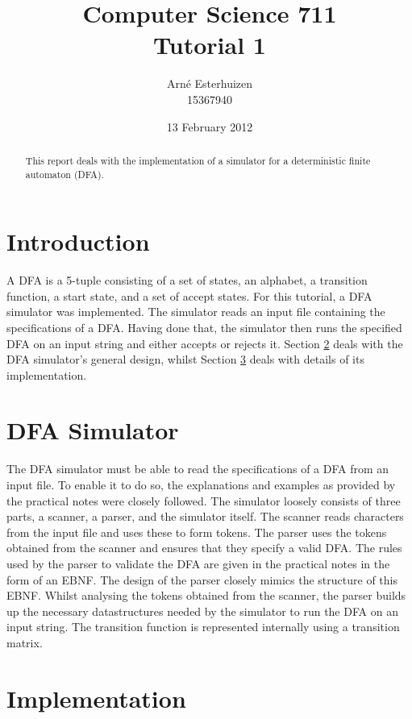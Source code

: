 \documentclass[11pt,a4paper]{article}
\begin{document}
\title{
	Computer Science 711 \\
	Tutorial 1
}
\author{
	Arn\'{e} Esterhuizen \\
	15367940
}
\date{13 February 2012}
\maketitle

\begin{abstract}
\noindent This report deals with the implementation of a simulator for a deterministic finite automaton (DFA).
\end{abstract}

\section{Introduction}
A DFA is a 5-tuple consisting of a set of states, an alphabet, a transition function, a start state, and
a set of accept states. For this tutorial, a DFA simulator was implemented. The simulator reads an input
file containing the specifications of a DFA. Having done that, the simulator then runs the specified
DFA on an input string and either accepts or rejects it. Section \ref{sec:sim} deals with the DFA simulator's
general design, whilst Section \ref{sec:imp} deals with details of its implementation.

\section{DFA Simulator}
\label{sec:sim}

The DFA simulator must be able to read the specifications of a DFA from an input file. To enable it to do so,
the explanations and examples as provided by the practical notes were closely followed. The simulator 
loosely consists of three parts, a scanner, a parser, and the simulator itself.
The scanner reads characters from the input file and uses these to form tokens. The parser uses the tokens
obtained from the scanner and ensures that they specify a valid DFA. The rules used by the parser to validate
the DFA are given in the practical notes in the form of an EBNF. The design of the parser closely mimics the structure
of this EBNF. Whilst analysing the tokens obtained from the scanner, the parser builds up the necessary datastructures
needed by the simulator to run the DFA on an input string. The transition function is represented internally using
a transition matrix.

\section{Implementation}
\label{sec:imp}
\end{document}
